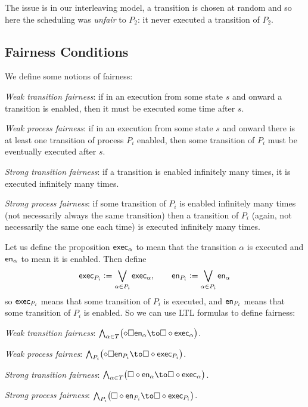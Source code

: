 The issue is in our interleaving model, a transition is chosen at random and so here the scheduling was {\it unfair} to $P_2$: it never executed a transition of $P_2$.

\subsection{Fairness Conditions}

We define some notions of fairness:

\benum
    \item {\it Weak transition fairness}: if in an execution from some state $s$ and onward a transition is enabled, then it must be executed some time after $s$.
    \item {\it Weak process fairness}: if in an execution from some state $s$ and onward there is at least one transition of process $P_i$ enabled, then some transition of $P_i$ must be eventually executed
        after $s$.
    \item {\it Strong transition fairness}: if a transition is enabled infinitely many times, it is executed infinitely many times.
    \item {\it Strong process fairness}: if some transition of $P_i$ is enabled infinitely many times (not necessarily always the same transition) then a transition of $P_i$ (again, not necessarily the same
        one each time) is executed infinitely many times.
\eenum

Let us define the proposition ${\sf exec}_\alpha$ to mean that the transition $\alpha$ is executed and ${\sf en}_\alpha$ to mean it is enabled.
Then define
$$ {\sf exec}_{P_i} \mathrel{{\mathop:}{=}} \bigvee_{\alpha\in P_i}{\sf exec}_\alpha,\qquad {\sf en}_{P_i} \mathrel{{\mathop:}{=}} \bigvee_{\alpha\in P_i}{\sf en}_\alpha $$
so ${\sf exec}_{P_i}$ means that some transition of $P_i$ is executed, and ${\sf en}_{P_i}$ means that some transition of $P_i$ is enabled.
So we can use LTL formulas to define fairness:

\benum
    \item {\it Weak transition fairness}: $\bigwedge_{\alpha\in T}\bigl(\diamond\square\en_\alpha\to\square\diamond\exec_\alpha\bigr)$.
    \item {\it Weak process fairnes}: $\bigwedge_{P_i}\bigl(\diamond\square\en_{P_i}\to\square\diamond\exec_{P_i}\bigr)$.
    \item {\it Strong transition fairness}: $\bigwedge_{\alpha\in T}\bigl(\square\diamond\en_\alpha\to\square\diamond\exec_\alpha\bigr)$.
    \item {\it Strong process fairness}: $\bigwedge_{P_i}\bigl(\square\diamond\en_{P_i}\to\square\diamond\exec_{P_i}\bigr)$.

